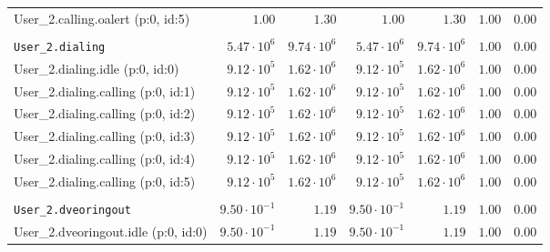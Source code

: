 \begin{table}[htbp]
{\begin{tabular}{lrrrrrr}
\hspace{3mm}User\_2.calling.oalert (p:0, id:5)        &               $1.00$ &               $1.30$ &               $1.00$ &               $1.30$ &               $1.00$ &               $0.00$ \\
\\[-8pt]\texttt{User\_2.dialing}                      &  $5.47 \cdot 10^{6}$ &  $9.74 \cdot 10^{6}$ &  $5.47 \cdot 10^{6}$ &  $9.74 \cdot 10^{6}$ &               $1.00$ &               $0.00$ \\
\hspace{3mm}User\_2.dialing.idle (p:0, id:0)          &  $9.12 \cdot 10^{5}$ &  $1.62 \cdot 10^{6}$ &  $9.12 \cdot 10^{5}$ &  $1.62 \cdot 10^{6}$ &               $1.00$ &               $0.00$ \\
\hspace{3mm}User\_2.dialing.calling (p:0, id:1)       &  $9.12 \cdot 10^{5}$ &  $1.62 \cdot 10^{6}$ &  $9.12 \cdot 10^{5}$ &  $1.62 \cdot 10^{6}$ &               $1.00$ &               $0.00$ \\
\hspace{3mm}User\_2.dialing.calling (p:0, id:2)       &  $9.12 \cdot 10^{5}$ &  $1.62 \cdot 10^{6}$ &  $9.12 \cdot 10^{5}$ &  $1.62 \cdot 10^{6}$ &               $1.00$ &               $0.00$ \\
\hspace{3mm}User\_2.dialing.calling (p:0, id:3)       &  $9.12 \cdot 10^{5}$ &  $1.62 \cdot 10^{6}$ &  $9.12 \cdot 10^{5}$ &  $1.62 \cdot 10^{6}$ &               $1.00$ &               $0.00$ \\
\hspace{3mm}User\_2.dialing.calling (p:0, id:4)       &  $9.12 \cdot 10^{5}$ &  $1.62 \cdot 10^{6}$ &  $9.12 \cdot 10^{5}$ &  $1.62 \cdot 10^{6}$ &               $1.00$ &               $0.00$ \\
\hspace{3mm}User\_2.dialing.calling (p:0, id:5)       &  $9.12 \cdot 10^{5}$ &  $1.62 \cdot 10^{6}$ &  $9.12 \cdot 10^{5}$ &  $1.62 \cdot 10^{6}$ &               $1.00$ &               $0.00$ \\
\\[-8pt]\texttt{User\_2.dveoringout}                  & $9.50 \cdot 10^{-1}$ &               $1.19$ & $9.50 \cdot 10^{-1}$ &               $1.19$ &               $1.00$ &               $0.00$ \\
\hspace{3mm}User\_2.dveoringout.idle (p:0, id:0)      & $9.50 \cdot 10^{-1}$ &               $1.19$ & $9.50 \cdot 10^{-1}$ &               $1.19$ &               $1.00$ &               $0.00$ \\

\end{tabular}}
\end{table}

